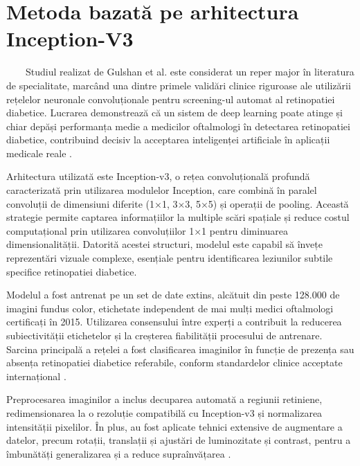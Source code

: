 \documentclass[12pt, a4paper, oneside, romanian]{teza-upb}
\begin{document}
\section{Metoda bazată pe arhitectura Inception-V3 \cite{3_gulshan2016development}}

\ \ \ \ Studiul realizat de Gulshan et al. \cite{3_gulshan2016development} este considerat un reper major în literatura de specialitate,
marcând una dintre primele validări clinice riguroase ale utilizării rețelelor neuronale convoluționale
pentru screening-ul automat al retinopatiei diabetice. Lucrarea demonstrează că un sistem de deep
learning poate atinge și chiar depăși performanța medie a medicilor oftalmologi în detectarea
retinopatiei diabetice, contribuind decisiv la acceptarea inteligenței artificiale în aplicații medicale reale
\cite{3_gulshan2016development}.
\bigskip

Arhitectura utilizată este Inception-v3, o rețea convoluțională profundă caracterizată prin
utilizarea modulelor Inception, care combină în paralel convoluții de dimensiuni diferite (1×1, 3×3, 5×5)
și operații de pooling. Această strategie permite captarea informațiilor la multiple scări spațiale și reduce
costul computațional prin utilizarea convoluțiilor 1×1 pentru diminuarea dimensionalității. Datorită
acestei structuri, modelul este capabil să învețe reprezentări vizuale complexe, esențiale pentru
identificarea leziunilor subtile specifice retinopatiei diabetice.
\bigskip

Modelul a fost antrenat pe un set de date extins, alcătuit din peste 128.000 de imagini fundus
color, etichetate independent de mai mulți medici oftalmologi certificați în 2015. Utilizarea consensului
între experți a contribuit la reducerea subiectivității etichetelor și la creșterea fiabilității procesului de
antrenare. Sarcina principală a rețelei a fost clasificarea imaginilor în funcție de prezența sau absența
retinopatiei diabetice referabile, conform standardelor clinice acceptate internațional \cite{3_gulshan2016development}.
\bigskip

Preprocesarea imaginilor a inclus decuparea automată a regiunii retiniene, redimensionarea la o
rezoluție compatibilă cu Inception-v3 și normalizarea intensității pixelilor. În plus, au fost aplicate tehnici
extensive de augmentare a datelor, precum rotații, translații și ajustări de luminozitate și contrast, pentru
a îmbunătăți generalizarea și a reduce supraînvățarea \cite{3_gulshan2016development} \cite{10_jabbar2022transfer}.
\bigskip
\end{document}
